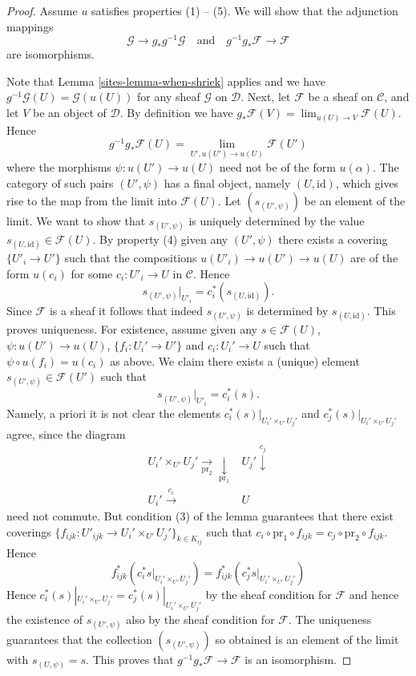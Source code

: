 \begin{proof}

Assume $u$ satisfies properties (1) -- (5). We will show that
the adjunction mappings
$$
\mathcal{G} \longrightarrow g_*g^{-1}\mathcal{G}
\quad\text{and}\quad
g^{-1}g_*\mathcal{F} \longrightarrow \mathcal{F}
$$
are isomorphisms.

\medskip\noindent
Note that Lemma \ref{sites-lemma-when-shriek} applies and we have
$g^{-1}\mathcal{G}(U) = \mathcal{G}(u(U))$ for any sheaf $\mathcal{G}$
on $\mathcal{D}$. Next, let $\mathcal{F}$ be a sheaf on $\mathcal{C}$,
and let $V$ be an object of $\mathcal{D}$. By definition we have
$g_*\mathcal{F}(V) = \lim_{u(U) \to V} \mathcal{F}(U)$.
Hence
$$
g^{-1}g_*\mathcal{F}(U) = \lim_{U', u(U') \to u(U)} \mathcal{F}(U')
$$
where the morphisms $\psi : u(U') \to u(U)$ need not be of the form
$u(\alpha)$. The category of such pairs $(U', \psi)$ has a final
object, namely $(U, \text{id})$, which gives rise to the map from
the limit into $\mathcal{F}(U)$. Let $(s_{(U', \psi)})$ be an element
of the limit. We want to show that $s_{(U', \psi)}$ is uniquely determined
by the value $s_{(U, \text{id})} \in \mathcal{F}(U)$. By property (4) given
any $(U', \psi)$ there exists a covering $\{U'_i \to U'\}$ such that the
compositions $u(U'_i) \to u(U') \to u(U)$ are of the form $u(c_i)$
for some $c_i : U'_i \to U$ in $\mathcal{C}$. Hence
$$
s_{(U', \psi)}|_{U'_i} = c_i^*(s_{(U, \text{id})}).
$$
Since $\mathcal{F}$ is a sheaf it follows that indeed $s_{(U', \psi)}$
is determined by $s_{(U, \text{id})}$. This proves uniqueness.
For existence, assume given any
$s \in \mathcal{F}(U)$, $\psi : u(U') \to u(U)$, $\{f_i : U_i' \to U'\}$
and $c_i : U_i' \to U$ such that $\psi \circ u(f_i) = u(c_i)$ as above.
We claim there exists a (unique) element
$s_{(U', \psi)} \in \mathcal{F}(U')$ such that
$$
s_{(U', \psi)}|_{U'_i} = c_i^*(s).
$$
Namely, a priori it is not clear the elements
$c_i^*(s)|_{U_i' \times_{U'} U_j'}$
and $c_j^*(s)|_{U_i' \times_{U'} U_j'}$ agree, since
the diagram
$$
\begin{array}{cc}U_i' \times_{U'} U_j' \underset{\text{pr}_2}{\longrightarrow}\underset{\text{pr}_1}{\downarrow} & U_j' \overset{c_j}{\downarrow} \\ U_i' \overset{c_i}{\longrightarrow} & U\end{array}
$$
need not commute. But condition (3) of the lemma guarantees that there
exist coverings
$\{f_{ijk} : U'_{ijk} \to U_i' \times_{U'} U_j'\}_{k \in K_{ij}}$ such that
$c_i \circ \text{pr}_1 \circ f_{ijk} = c_j \circ \text{pr}_2 \circ f_{ijk}$.
Hence
$$
f_{ijk}^* \left(c_i^*s|_{U_i' \times_{U'} U_j'}\right)
=
f_{ijk}^* \left(c_j^*s|_{U_i' \times_{U'} U_j'}\right)
$$
Hence $c_i^*(s)|_{U_i' \times_{U'} U_j'} = c_j^*(s)|_{U_i' \times_{U'} U_j'}$
by the sheaf condition for $\mathcal{F}$ and hence the existence of
$s_{(U', \psi)}$ also by the sheaf condition for $\mathcal{F}$. The uniqueness
guarantees that the collection $(s_{(U', \psi)})$ so obtained is an element
of the limit with $s_{(U, \psi)} = s$. This proves
that $g^{-1}g_*\mathcal{F} \to \mathcal{F}$ is an isomorphism.


\end{proof}
